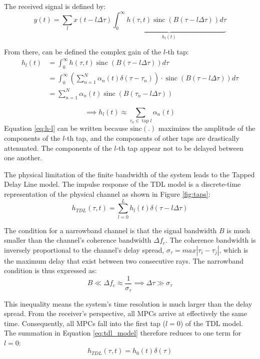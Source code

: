 The received signal is defined by:
\begin{equation}
	y(t) = \sum_l x(t-l \Delta \tau) \underbrace{\int_0^{\infty} h(\tau, t) \operatorname{sinc}(B(\tau-l \Delta \tau)) d \tau}_{h_l(t)}
\end{equation}

From there, can be defined the complex gain of the $l$-th tap:
\begin{align}
	h_l(t) &= \int_0^{\infty} h(\tau, t) \operatorname{sinc}(B(\tau-l \Delta \tau)) d \tau \\
	&= \int_0^{\infty} (\sum_{n=1}^{N} \alpha_n(t) \delta(\tau - \tau_n)) \cdot \operatorname{sinc}(B(\tau-l \Delta \tau)) d \tau \\
	 &= \sum_{n=1}^N \alpha_n(t) \operatorname{sinc}\left(B\left(\tau_n-l \Delta \tau\right)\right)
\end{align}

\begin{equation}
	\label{eq:h-l}
	\implies \boxed{h_l(t) \approx \sum_{\tau_n \in \operatorname{tap} l} \alpha_n(t)} 
\end{equation}
Equation \eqref{eq:h-l} can be written because $\operatorname{sinc(.)}$ maximizes the amplitude of the components of the  $l$-th tap, and the components of other taps are drastically attenuated. The components of the $l$-th tap appear not to be delayed between one another.

The physical limitation of the finite bandwidth of the system leads to the Tapped Delay Line model. The impulse response of the TDL model is a discrete-time representation of the physical channel as shown in Figure \ref{fig:taps}:
\begin{equation}
	h_{TDL}(\tau, t) = \sum_{l=0}^{L} h_l(t) \delta(\tau - l\Delta\tau)
	\label{eq:tdl_model}
\end{equation}


The condition for a narrowband channel is that the signal bandwidth $B$ is much smaller than the channel's coherence bandwidth $\Delta f_c$. The coherence bandwidth is inversely proportional to the channel's delay spread, $\sigma_\tau = max|\tau_i - \tau_j|$, which is the maximum delay that exist between two consecutive rays. The narrowband condition is thus expressed as:
\begin{equation}
	B \ll \Delta f_c \approx \frac{1}{\sigma_\tau} \implies \Delta\tau \gg \sigma_\tau
\end{equation}

This inequality means the system's time resolution is much larger than the delay spread. From the receiver's perspective, all MPCs arrive at effectively the same time. Consequently, all MPCs fall into the first tap ($l=0$) of the TDL model. The summation in Equation \eqref{eq:tdl_model} therefore reduces to one term for $l=0$:
\begin{equation}
	\label{eq:tdl-narrow}
	h_{TDL}(\tau, t) = h_0(t) \delta(\tau)
\end{equation}

